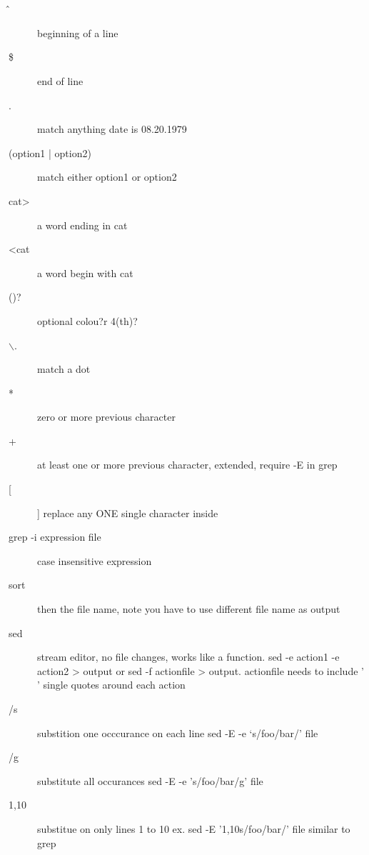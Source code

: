 \documentclass[12pt,a4paper]{report}
\begin{document}
\subsection{\color{Magenta}{RegEx}\\}
\begin{description}
\item[\^\,] beginning of a line \\
\item[\$] end of line  \\
\item[.] match anything date is 08.20.1979  \\
\item[(option1 | option2)] match either option1 or option2  \\
\item[cat>] a word ending in cat  \\
\item[<cat] a word begin with cat  \\
\item[()?] optional colou?r 4(th)?  \\
\item[$\backslash$.] match a dot\\
\item[*] zero or more previous character  \\
\item[+] at least one or more previous character, extended, require -E in grep  \\
\item[[]] replace any ONE single character inside   \\
\item[grep -i expression file] case insensitive expression\\
\item[sort] then the file name, note you have to use different file name as output  \\
\item[sed] stream editor, no file changes, works like a function. sed -e action1 -e action2 > output or sed -f actionfile > output. actionfile needs to include ' ' single quotes around each action  \\
\item[/s] substition one occcurance on each line sed -E -e `s/foo/bar/' file  \\
\item[/g]  substitute all occurances sed -E -e 's/foo/bar/g' file  \\
\item[1,10] substitue on only lines 1 to 10 ex. sed -E '1,10s/foo/bar/' file similar to grep \\

\end{description}
\end{document}
